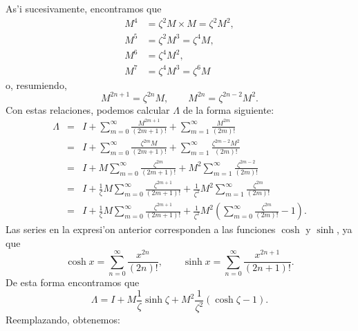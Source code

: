 As'i sucesivamente, encontramos que
\begin{align}
M^4  &  =\zeta^2 M\times M=\zeta^2 M^2 ,\\
M^{5}  &  =\zeta^2 M^3=\zeta^4 M ,\\
M^{6}  &  =\zeta^4 M^2 ,\\
M^{7}  &  =\zeta^4 M^3=\zeta^{6}M
\end{align}
o, resumiendo,
\begin{equation}
M^{2n+1}   =\zeta^{2n} M, \qquad M^{2n}    =\zeta^{2n-2} M^2.
\end{equation}
Con estas relaciones, podemos calcular $\Lambda$ de la forma siguiente:
\begin{eqnarray}
\Lambda &=& I+\sum_{m=0}^{\infty}\frac{M^{2m+1}}{\left(  2m+1\right)  !}
+\sum_{m=1}^{\infty}\frac{M^{2m}}{\left(  2m\right)  !}\\
&=& I+\sum_{m=0}^{\infty}\frac{\zeta^{2m}M}{\left(  2m+1\right)  !}+\sum
_{m=1}^{\infty}\frac{\zeta^{2m-2}M^2}{\left(  2m\right)  !}\\
&=& I+M\sum_{m=0}^{\infty}\frac{\zeta^{2m}}{\left(  2m+1\right)  !}+M^2
\sum_{m=1}^{\infty}\frac{\zeta^{2m-2}}{\left(  2m\right)  !}\\
&=& I+\frac{1}{\zeta}M\sum_{m=0}^{\infty}\frac{\zeta^{2m+1}}{\left(
2m+1\right)  !}+\frac{1}{\zeta^2}M^2\sum_{m=1}^{\infty}\frac{\zeta^{2m}}{\left(
2m\right)  !}\\
&=& I+\frac{1}{\zeta}M\sum_{m=0}^{\infty}\frac{\zeta^{2m+1}}{\left(
2m+1\right)  !}+\frac{1}{\zeta^2}M^2\left(
\sum_{m=0}^{\infty}\frac{\zeta^{2m}}{\left(  2m\right)  !}-1\right).
\end{eqnarray}
Las series en la expresi'on anterior corresponden a las funciones $\cosh$ y
$\sinh$, ya que
\begin{equation}
\cosh x =\sum_{n=0}^{\infty}\frac{x^{2n}}{\left(  2n\right)  !}, \qquad
\sinh x =\sum_{n=0}^{\infty}\frac{x^{2n+1}}{\left(  2n+1\right)  !}.
\end{equation}
De esta forma encontramos que
\begin{equation}
\Lambda
=I+M\frac{1}{\zeta}\sinh\zeta+M^2\frac{1}{\zeta^2}\left(\cosh\zeta-1\right).
\end{equation}
Reemplazando, obtenemos:
